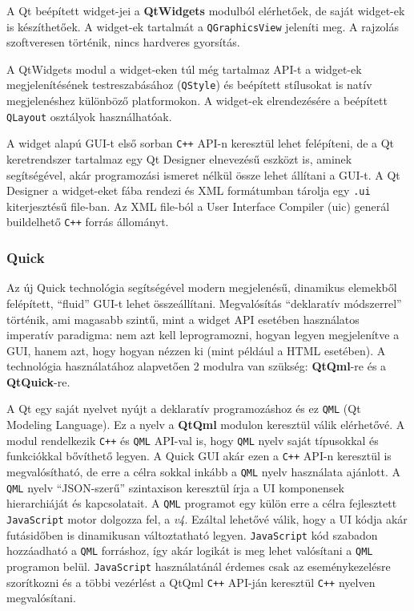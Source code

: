 \documentclass[12pt]{report}
\begin{document}
A Qt beépített widget-jei a \textbf{QtWidgets} modulból elérhetőek, de saját widget-ek is
készíthetőek. A widget-ek tartalmát a \texttt{QGraphicsView} jeleníti meg. A rajzolás
szoftveresen történik, nincs hardveres gyorsítás.

A QtWidgets modul a widget-eken túl még tartalmaz API-t a widget-ek megjelenítésének
testreszabásához (\texttt{QStyle}) és beépített stílusokat is natív megjelenéshez különböző
platformokon. A widget-ek elrendezésére a beépített \texttt{QLayout} osztályok használhatóak.

A widget alapú GUI-t első sorban \texttt{C++} API-n keresztül lehet felépíteni, de a Qt
keretrendszer tartalmaz egy Qt Designer elnevezésű eszközt is, aminek segítségével,
akár programozási ismeret nélkül össze lehet állítani a GUI-t. A Qt Designer a widget-eket
fába rendezi és XML formátumban tárolja egy \texttt{.ui} kiterjesztésű file-ban. Az XML
file-ból a User Interface Compiler (uic) generál buildelhető \texttt{C++} forrás állományt.

\subsubsection{Quick}
Az új Quick technológia segítségével modern megjelenésű, dinamikus elemekből felépített,
``fluid'' GUI-t lehet összeállítani. Megvalósítás ``deklaratív módszerrel'' történik, ami
magasabb szintű, mint a widget API esetében használatos imperatív paradigma: nem azt kell
leprogramozni, hogyan legyen megjelenítve a GUI, hanem azt, hogy hogyan nézzen ki
(mint például a HTML esetében). A technológia használatához alapvetően 2 modulra van
szükség: \textbf{QtQml}-re és a \textbf{QtQuick}-re.

A Qt egy saját nyelvet nyújt a deklaratív programozáshoz és ez \texttt{QML} (Qt Modeling
Language). Ez a nyelv a \textbf{QtQml} modulon keresztül válik elérhetővé.
A modul rendelkezik \texttt{C++} és \texttt{QML} API-val is, hogy \texttt{QML} nyelv saját
típusokkal és  funkciókkal bővíthető legyen.
A Quick GUI akár ezen a \texttt{C++} API-n keresztül is megvalósítható, de erre a célra
sokkal inkább a \texttt{QML} nyelv használata ajánlott.
A \texttt{QML} nyelv ``JSON-szerű'' szintaxison keresztül írja a UI komponensek
hierarchiáját és kapcsolatait. A \texttt{QML} programot egy külön erre a célra fejlesztett
\texttt{JavaScript} motor dolgozza fel, a \textit{v4}. Ezáltal lehetővé válik, hogy a
UI kódja akár futásidőben is dinamikusan változtatható legyen. \texttt{JavaScript}
kód szabadon hozzáadható a \texttt{QML} forráshoz, így akár logikát is meg lehet valósítani a
\texttt{QML} programon belül. \texttt{JavaScript} használatánál érdemes csak az
eseménykezelésre szorítkozni és a többi vezérlést a QtQml \texttt{C++} API-ján keresztül
\texttt{C++} nyelven megvalósítani.
\cite{bib:qt-doc-qt-qml}
\end{document}
